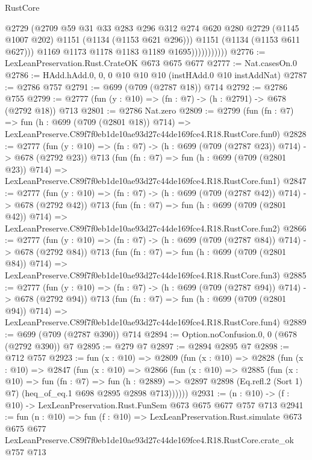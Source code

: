 \begin{lexlean}{RustCore}
\begin{coremodule}
                            @2729
                            (@2709
                              @59
                              @31
                              @33
                              @283
                              @296
                              @312
                              @274
                              @620
                              @280
                              @2729
                              (@1145 @1007 @202)
                              @1151
                              (@1134 (@1153 @621 @296)))
                            @1151
                            (@1134 (@1153 @611 @627)))
                          @1169
                          @1173
                          @1178
                          @1183
                          @1189
                          @1695)))))))))))
@2776 := LexLeanPreservation.Rust.CrateOK @673 @675 @677
@2777 := Nat.casesOn.{0}
@2786 := HAdd.hAdd.{0, 0, 0} @10 @10 @10 (instHAdd.{0} @10 instAddNat)
@2787 := @2786 @757
@2791 := @699 (@709 (@2787 @18)) @714
@2792 := @2786 @755
@2799 := @2777 (fun (y : @10) => (fn : @7) -> (h : @2791) -> @678 (@2792 @18)) @713
@2801 := @2786 Nat.zero
@2809 := @2799
    (fun (fn : @7) =>
    fun (h : @699 (@709 (@2801 @18)) @714) =>
    LexLeanPreserve.C89f7f0eb1de10ae93d27c44de169fce4.R18.RustCore.fun0)
@2828 := @2777
    (fun (y : @10) => (fn : @7) -> (h : @699 (@709 (@2787 @23)) @714) -> @678 (@2792 @23))
    @713
    (fun (fn : @7) =>
    fun (h : @699 (@709 (@2801 @23)) @714) =>
    LexLeanPreserve.C89f7f0eb1de10ae93d27c44de169fce4.R18.RustCore.fun1)
@2847 := @2777
    (fun (y : @10) => (fn : @7) -> (h : @699 (@709 (@2787 @42)) @714) -> @678 (@2792 @42))
    @713
    (fun (fn : @7) =>
    fun (h : @699 (@709 (@2801 @42)) @714) =>
    LexLeanPreserve.C89f7f0eb1de10ae93d27c44de169fce4.R18.RustCore.fun2)
@2866 := @2777
    (fun (y : @10) => (fn : @7) -> (h : @699 (@709 (@2787 @84)) @714) -> @678 (@2792 @84))
    @713
    (fun (fn : @7) =>
    fun (h : @699 (@709 (@2801 @84)) @714) =>
    LexLeanPreserve.C89f7f0eb1de10ae93d27c44de169fce4.R18.RustCore.fun3)
@2885 := @2777
    (fun (y : @10) => (fn : @7) -> (h : @699 (@709 (@2787 @94)) @714) -> @678 (@2792 @94))
    @713
    (fun (fn : @7) =>
    fun (h : @699 (@709 (@2801 @94)) @714) =>
    LexLeanPreserve.C89f7f0eb1de10ae93d27c44de169fce4.R18.RustCore.fun4)
@2889 := @699 (@709 (@2787 @390)) @714
@2894 := Option.noConfusion.{0, 0} (@678 (@2792 @390)) @7
@2895 := @279 @7
@2897 := @2894 @2895 @7
@2898 := @712 @757
@2923 := fun (x : @10) =>
  @2809
    (fun (x : @10) =>
    @2828
      (fun (x : @10) =>
      @2847
        (fun (x : @10) =>
        @2866
          (fun (x : @10) =>
          @2885
            (fun (x : @10) =>
            fun (fn : @7) =>
            fun (h : @2889) =>
            @2897 @2898 (Eq.refl.{2} (Sort 1) @7) (heq_of_eq.{1} @698 @2895 @2898 @713))))))
@2931 := (n : @10) -> (f : @10) -> LexLeanPreservation.Rust.FunSem @673 @675 @677 @757 @713
@2941 := fun (n : @10) =>
  fun (f : @10) =>
  LexLeanPreservation.Rust.simulate
    @673
    @675
    @677
    LexLeanPreserve.C89f7f0eb1de10ae93d27c44de169fce4.R18.RustCore.crate_ok
    @757
    @713
\end{coremodule}
\end{lexlean}
